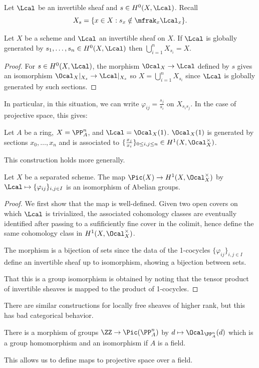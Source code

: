 Let $\Lcal$ be an invertible sheaf and $s\in H^{0}(X,\Lcal)$. Recall 
$$X_{s}=\{x\in X:s_{x}\notin\mfrak_{x}\Lcal_{x}\}.$$
\begin{proposition}\label{prop: global generation and covering}
    Let $X$ be a scheme and $\Lcal$ an invertible sheaf on $X$. If $\Lcal$ is globally generated by $s_{1},\dots,s_{n}\in H^{0}(X,\Lcal)$ then $\bigcup_{i=1}^{n}X_{s_{i}}=X$. 
\end{proposition}
\begin{proof}
    For $s\in H^{0}(X,\Lcal)$, the morphism $\Ocal_{X}\to\Lcal$ defined by $s$ gives an isomorphism $\Ocal_{X}|_{X_{s}}\to\Lcal|_{X_{s}}$ so $X=\bigcup_{i=1}^{n}X_{s_{i}}$ since $\Lcal$ is globally generated by such sections. 
\end{proof}
In particular, in this situation, we can write $\varphi_{ij}=\frac{s_{j}}{s_{i}}$ on $X_{s_{i}s_{j}}$. In the case of projective space, this gives:
\begin{example}
    Let $A$ be a ring, $X=\PP^{n}_{A}$, and $\Lcal=\Ocal_{X}(1)$. $\Ocal_{X}(1)$ is generated by sections $x_{0},\dots,x_{n}$ and is associated to $\{\frac{x_{j}}{x_{i}}\}_{0\leq i,j\leq n}\in H^{1}(X,\Ocal_{X}^{\times})$. 
\end{example}
This construction holds more generally. 
\begin{proposition}\label{prop: map from Pic to unit torsors}
    Let $X$ be a separated scheme. The map $\Pic(X)\to H^{1}(X,\Ocal_{X}^{\times})$ by $\Lcal\mapsto\{\varphi_{ij}\}_{i,j\in I}$ is an isomorphism of Abelian groups. 
\end{proposition}
\begin{proof}
    We first show that the map is well-defined. Given two open covers on which $\Lcal$ is trivialized, the associated cohomology classes are eventually identified after passing to a sufificiently fine cover in the colimit, hence define the same cohomology class in $H^{1}(X,\Ocal_{X}^{\times})$. 

    The morphism is a bijection of sets since the data of the 1-cocycles $\{\varphi_{ij}\}_{i,j\in I}$ define an invertible sheaf up to isomorphism, showing a bijection between sets. 

    That this is a group isomorphism is obtained by noting that the tensor product of invertible sheaves is mapped to the product of 1-cocycles. 
\end{proof}
\begin{remark}
    There are similar constructions for locally free sheaves of higher rank, but this has bad categorical behavior. 
\end{remark}
\begin{example}
    There is a morphism of groups $\ZZ\to\Pic(\PP^{n}_{A})$ by $d\mapsto\Ocal_{\PP^{n}_{A}}(d)$ which is a group homomorphism and an isomorphism if $A$ is a field. 
\end{example}
This allows us to define maps to projective space over a field. 

